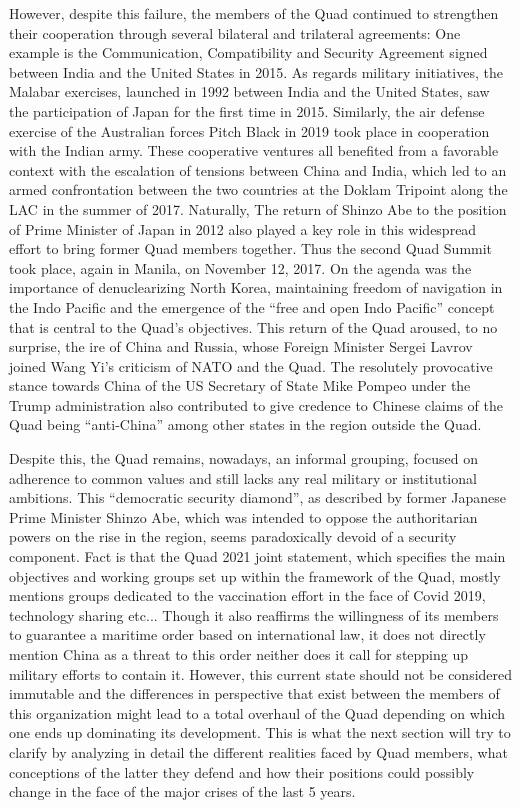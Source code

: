 \documentclass[11pt,a4paper]{article}
\begin{document}
However, despite this failure, the members of the Quad continued to strengthen their cooperation through several bilateral and trilateral agreements: One example is the Communication, Compatibility and Security Agreement signed between India and the United States in 2015. As regards military initiatives, the Malabar exercises, launched in 1992 between India and the United States, saw the participation of Japan for the first time in 2015. Similarly, the air defense exercise of the Australian forces Pitch Black in 2019 took place in cooperation with the Indian army. These cooperative ventures all benefited from a favorable context with the escalation of tensions between China and India, which led to an armed confrontation between the two countries at the Doklam Tripoint along the LAC in the summer of 2017. Naturally, The return of Shinzo Abe to the position of Prime Minister of Japan in 2012 also played a key role in this widespread effort to bring former Quad members together. Thus the second Quad Summit took place, again in Manila, on November 12, 2017. On the agenda was the importance of denuclearizing North Korea, maintaining freedom of navigation in the Indo Pacific and the emergence of the “free and open Indo Pacific” concept that is central to the Quad’s objectives. This return of the Quad aroused, to no surprise, the ire of China and Russia, whose Foreign Minister Sergei Lavrov joined Wang Yi’s criticism of NATO and the Quad. The resolutely provocative stance towards China of the US Secretary of State Mike Pompeo under the Trump administration also contributed to give credence to Chinese claims of the Quad being “anti-China” among other states in the region outside the Quad.

Despite this, the Quad remains, nowadays, an informal grouping, focused on adherence to common values and still lacks any real military or institutional ambitions. This “democratic security diamond”, as described by former Japanese Prime Minister Shinzo Abe, which was intended to oppose the authoritarian powers on the rise in the region, seems paradoxically devoid of a security component. Fact is that the Quad 2021 joint statement, which specifies the main objectives and working groups set up within the framework of the Quad, mostly mentions groups dedicated to the vaccination effort in the face of Covid 2019, technology sharing etc... Though it also reaffirms the willingness of its members to guarantee a maritime order based on international law, it does not directly mention China as a threat to this order neither does it call for stepping up military efforts to contain it. However, this current state should not be considered immutable and the differences in perspective that exist between the members of this organization might lead to a total overhaul of the Quad depending on which one ends up dominating its development. This is what the next section will try to clarify by analyzing in detail the different realities faced by Quad members, what conceptions of the latter they defend and how their positions could possibly change in the face of the major crises of the last 5 years.
\end{document}
